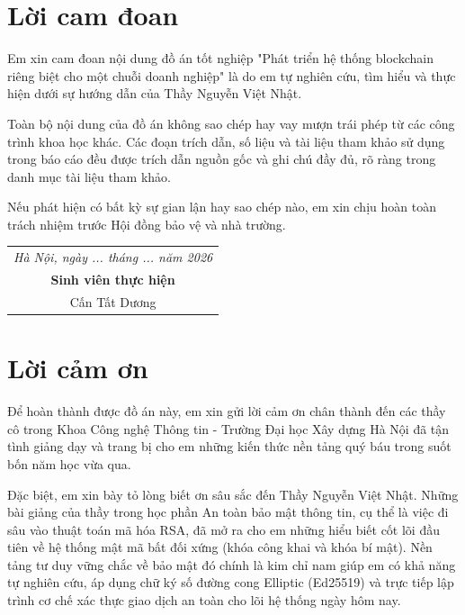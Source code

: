 \documentclass[12pt,a4paper]{article}
\begin{document}
\section*{Lời cam đoan}

Em xin cam đoan nội dung đồ án tốt nghiệp "Phát triển hệ thống blockchain riêng biệt cho một chuỗi doanh nghiệp" là do em tự nghiên cứu, tìm hiểu và thực hiện dưới sự hướng dẫn của Thầy Nguyễn Việt Nhật. 

Toàn bộ nội dung của đồ án không sao chép hay vay mượn trái phép từ các công trình khoa học khác. Các đoạn trích dẫn, số liệu và tài liệu tham khảo sử dụng trong báo cáo đều được trích dẫn nguồn gốc và ghi chú đầy đủ, rõ ràng trong danh mục tài liệu tham khảo.

Nếu phát hiện có bất kỳ sự gian lận hay sao chép nào, em xin chịu hoàn toàn trách nhiệm trước Hội đồng bảo vệ và nhà trường.

\vspace{1cm}
\begin{flushright}
    \begin{tabular}{c}
        \textit{Hà Nội, ngày ... tháng ... năm 2026} \\[0.5cm]
        \textbf{Sinh viên thực hiện} \\[2cm] %
        Cấn Tất Dương
    \end{tabular}
\end{flushright}

\newpage
\section*{Lời cảm ơn}

Để hoàn thành được đồ án này, em xin gửi lời cảm ơn chân thành đến các thầy cô trong Khoa Công nghệ Thông tin - Trường Đại học Xây dựng Hà Nội đã tận tình giảng dạy và trang bị cho em những kiến thức nền tảng quý báu trong suốt bốn năm học vừa qua.

Đặc biệt, em xin bày tỏ lòng biết ơn sâu sắc đến Thầy Nguyễn Việt Nhật. Những bài giảng của thầy trong học phần An toàn bảo mật thông tin, cụ thể là việc đi sâu vào thuật toán mã hóa RSA, đã mở ra cho em những hiểu biết cốt lõi đầu tiên về hệ thống mật mã bất đối xứng (khóa công khai và khóa bí mật). Nền tảng tư duy vững chắc về bảo mật đó chính là kim chỉ nam giúp em có khả năng tự nghiên cứu, áp dụng chữ ký số đường cong Elliptic (Ed25519) \cite{bernstein} và trực tiếp lập trình cơ chế xác thực giao dịch an toàn cho lõi hệ thống ngày hôm nay.
\end{document}
